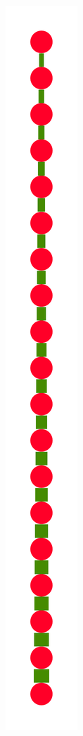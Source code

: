 \documentclass[a4paper,10pt]{article}
\begin{document}
\begin{figure}
{    \includegraphics[scale=.14]{../figures/vector/6-3-recursion-data-2.pdf}
}
\end{figure}
\end{document}
